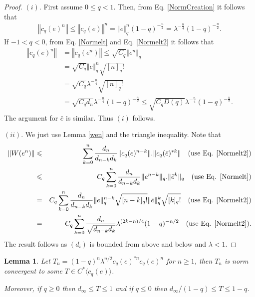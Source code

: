 \documentclass[12pt, a4paper,reqno]{amsart}
\newtheorem{Lemma}[Theorem]{Lemma}
\theoremstyle{definition}
\renewcommand{\leq}{\leqslant}
\renewcommand{\geq}{\geqslant}
\newcommand{\norm}[1]{\left\Vert#1\right\Vert}
\begin{document}
\begin{proof}
\noindent $(i)$. First assume $0\leq q<1$. Then, from Eq. \eqref{NormCreation} it follows that 
\begin{align*}
\norm{c_q(e)^n} \leq \norm{c_q(e)}^n = \norm{e}_q^n (1-q)^{-\frac{n}{2}} = \lambda^{-\frac{n}{4}}(1-q)^{-\frac{n}{2}}.
\end{align*}
If $-1<q<0$, from Eq. \eqref{Normelt} and Eq. \eqref{Normelt2} it follows that 
\begin{align*}
\norm{c_q(e)^n}&=\norm{c_q(e^n)}\leq \sqrt{C_q} \norm{e^n}_q\\
& = \sqrt{C_q}\norm{e}_q^n \sqrt{[n]_q!}\\
&=\sqrt{C_q}\lambda^{-\frac{n}{4}} \sqrt{[n]_q!}\\
&=\sqrt{C_qd_n}\lambda^{-\frac{n}{4}} (1-q)^{-\frac{n}{2}}\leq \sqrt{C_qD(q)}\lambda^{-\frac{n}{4}} (1-q)^{-\frac{n}{2}}. 
\end{align*}
The argument for $\bar e$ is similar. Thus $(i)$ follows.

\noindent $(ii)$. We just use  Lemma \ref{wen} and the triangle inequality. Note that 
\begin{eqnarray*}
\| W(e^n)\| &\leq &\sum_{k=0}^{n}  \frac{d_n}{d_{n-k}d_k}  \|c_q(e)^{n-k}\|. \|c_q(\bar{e})^{* k}\| \quad (\text{use Eq. \eqref{Normelt2}})\\
& \leq & C_q \sum_{k=0}^{n} \frac{d_n}{d_{n-k}d_k} \|e^{n-k}\|_q.\|\bar{e}^{k}\|_q \quad (\text{use Eq. \eqref{Normelt}})\\
& = &C_q \sum_{k=0}^n  \frac{d_n}{d_{n-k}d_k} \|e\|_q^{n-k} \sqrt{[n-k]_q!}
\|\bar e\|_q^{k} \sqrt{[k]_q!}\quad (\text{use Eq. \eqref{Normelt2}})\\
&= & C_q   \sum_{k=0}^n  \frac{d_n}{\sqrt{d_{n-k}d_k}} \lambda^{(2k-n)/4}
(1-q)^{-n/2} \quad (\text{use Eq. \eqref{Normelt2}}).
\end{eqnarray*}
The result follows as $(d_i)$ is bounded from above and below and $\lambda<1$.
\end{proof}

\begin{Lemma}\label{Tn}
Let $T_n=(1-q)^n\lambda^{n/2}c_q(e)^{* n } c_q(e)^n$ for $n\geq 1$, then $T_n$ is norm convergent to some $T\in C^*\langle c_q(e)\rangle$.

Moreover, if  $q\geq0$ then $ d_\infty \leq  T\leq 1$ and if $q\leq0$ then $d_\infty/(1-q) \leq T \leq 1-q$.
\end{Lemma}	
\end{document}
